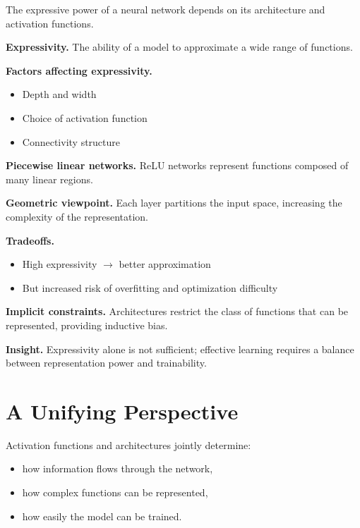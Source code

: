 The expressive power of a neural network depends on its architecture and activation functions.

\medskip

\noindent
\textbf{Expressivity.}  
The ability of a model to approximate a wide range of functions.

\medskip

\noindent
\textbf{Factors affecting expressivity.}
\begin{itemize}
    \item Depth and width
    \item Choice of activation function
    \item Connectivity structure
\end{itemize}

\medskip

\noindent
\textbf{Piecewise linear networks.}  
ReLU networks represent functions composed of many linear regions.

\medskip

\noindent
\textbf{Geometric viewpoint.}  
Each layer partitions the input space, increasing the complexity of the representation.

\medskip

\noindent
\textbf{Tradeoffs.}
\begin{itemize}
    \item High expressivity $\rightarrow$ better approximation
    \item But increased risk of overfitting and optimization difficulty
\end{itemize}

\medskip

\noindent
\textbf{Implicit constraints.}  
Architectures restrict the class of functions that can be represented, providing inductive bias.

\medskip

\noindent
\textbf{Insight.}  
Expressivity alone is not sufficient; effective learning requires a balance between representation power and trainability.

\section{A Unifying Perspective}

Activation functions and architectures jointly determine:

\begin{itemize}
    \item how information flows through the network,
    \item how complex functions can be represented,
    \item how easily the model can be trained.
\end{itemize}

